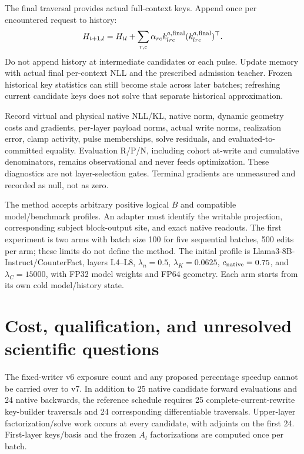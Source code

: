 \documentclass[10pt]{article}
\begin{document}
The final traversal provides actual full-context keys. Append once per
encountered request to history:
\[
 H_{t+1,l}=H_{tl}+\sum_{r,c}\alpha_{rc}
 k^{a,\rm final}_{lrc}(k^{a,\rm final}_{lrc})^\top.
\]
Do not append history at intermediate candidates or each pulse. Update
memory with actual final per-context NLL and the prescribed admission
teacher. Frozen historical key statistics can still become stale across
later batches; refreshing current candidate keys does not solve that
separate historical approximation.

Record virtual and physical native NLL/KL, native norm, dynamic geometry
costs and gradients, per-layer payload norms, actual write norms,
realization error, clamp activity, pulse memberships, solve residuals,
and evaluated-to-committed equality. Evaluation R/P/N, including cohort
at-write and cumulative denominators, remains observational and never
feeds optimization. These diagnostics are not layer-selection gates.
Terminal gradients are unmeasured and recorded as null, not as zero.

The method accepts arbitrary positive logical $B$ and compatible
model/benchmark profiles. An adapter must identify the writable projection,
corresponding subject block-output site, and exact native readouts. The
first experiment is two arms with batch size 100 for five sequential
batches, 500 edits per arm; these limits do not define the method.
The initial profile is Llama3-8B-Instruct/CounterFact, layers L4--L8,
$\lambda_n=0.5$, $\lambda_K=0.0625$, $c_{\rm native}=0.75$,
and $\lambda_C=15000$, with FP32 model weights and FP64 geometry.
Each arm starts from its own cold model/history state.

\newpage
\section{Cost, qualification, and unresolved scientific questions}
The fixed-writer v6 exposure count and any proposed percentage speedup
cannot be carried over to v7. In addition to 25 native candidate forward
evaluations and 24 native backwards, the reference schedule requires
25 complete-current-rewrite key-builder traversals and 24 corresponding
differentiable traversals. Upper-layer factorization/solve work occurs
at every candidate, with adjoints on the first 24. First-layer keys/basis
and the frozen $A_l$ factorizations are computed once per batch.
\end{document}
